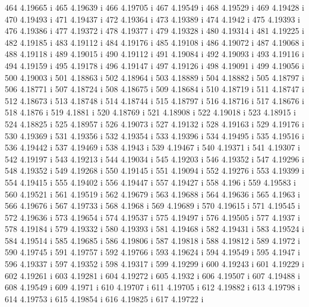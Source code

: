  464  4.19665  i
 465  4.19639  i
 466  4.19705  i
 467  4.19549  i
 468  4.19529  i
 469  4.19428  i
 470  4.19493  i
 471  4.19437  i
 472  4.19364  i
 473  4.19389  i
 474  4.1942  i
 475  4.19393  i
 476  4.19386  i
 477  4.19372  i
 478  4.19377  i
 479  4.19328  i
 480  4.19314  i
 481  4.19225  i
 482  4.19185  i
 483  4.19112  i
 484  4.19176  i
 485  4.19108  i
 486  4.19072  i
 487  4.19068  i
 488  4.19118  i
 489  4.19015  i
 490  4.19112  i
 491  4.19084  i
 492  4.19093  i
 493  4.19116  i
 494  4.19159  i
 495  4.19178  i
 496  4.19147  i
 497  4.19126  i
 498  4.19091  i
 499  4.19056  i
 500  4.19003  i
 501  4.18863  i
 502  4.18964  i
 503  4.18889  i
 504  4.18882  i
 505  4.18797  i
 506  4.18771  i
 507  4.18724  i
 508  4.18675  i
 509  4.18684  i
 510  4.18719  i
 511  4.18747  i
 512  4.18673  i
 513  4.18748  i
 514  4.18744  i
 515  4.18797  i
 516  4.18716  i
 517  4.18676  i
 518  4.1876  i
 519  4.1881  i
 520  4.18769  i
 521  4.18908  i
 522  4.19018  i
 523  4.18915  i
 524  4.18825  i
 525  4.18957  i
 526  4.19073  i
 527  4.19132  i
 528  4.19163  i
 529  4.19176  i
 530  4.19369  i
 531  4.19356  i
 532  4.19354  i
 533  4.19396  i
 534  4.19495  i
 535  4.19516  i
 536  4.19442  i
 537  4.19469  i
 538  4.1943  i
 539  4.19467  i
 540  4.19371  i
 541  4.19307  i
 542  4.19197  i
 543  4.19213  i
 544  4.19034  i
 545  4.19203  i
 546  4.19352  i
 547  4.19296  i
 548  4.19352  i
 549  4.19268  i
 550  4.19145  i
 551  4.19094  i
 552  4.19276  i
 553  4.19399  i
 554  4.19415  i
 555  4.19402  i
 556  4.19447  i
 557  4.19427  i
 558  4.196  i
 559  4.19583  i
 560  4.19521  i
 561  4.19519  i
 562  4.19679  i
 563  4.19688  i
 564  4.19636  i
 565  4.1963  i
 566  4.19676  i
 567  4.19733  i
 568  4.1968  i
 569  4.19689  i
 570  4.19615  i
 571  4.19545  i
 572  4.19636  i
 573  4.19654  i
 574  4.19537  i
 575  4.19497  i
 576  4.19505  i
 577  4.1937  i
 578  4.19184  i
 579  4.19332  i
 580  4.19393  i
 581  4.19468  i
 582  4.19431  i
 583  4.19524  i
 584  4.19514  i
 585  4.19685  i
 586  4.19806  i
 587  4.19818  i
 588  4.19812  i
 589  4.1972  i
 590  4.19745  i
 591  4.19757  i
 592  4.19766  i
 593  4.19624  i
 594  4.19549  i
 595  4.1947  i
 596  4.19337  i
 597  4.19352  i
 598  4.19317  i
 599  4.19299  i
 600  4.19243  i
 601  4.19229  i
 602  4.19261  i
 603  4.19281  i
 604  4.19272  i
 605  4.1932  i
 606  4.19507  i
 607  4.19488  i
 608  4.19549  i
 609  4.1971  i
 610  4.19707  i
 611  4.19705  i
 612  4.19882  i
 613  4.19798  i
 614  4.19753  i
 615  4.19854  i
 616  4.19825  i
 617  4.19722  i
